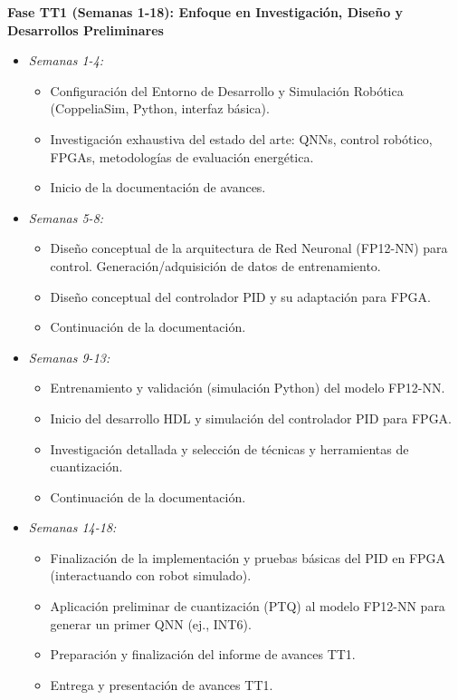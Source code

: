 \documentclass[12pt]{article}
\begin{document}
\textbf{Fase TT1 (Semanas 1-18): Enfoque en Investigación, Diseño y Desarrollos Preliminares}
\begin{itemize}
    \item \textit{Semanas 1-4:}
        \begin{itemize}
            \item [EP01] Configuración del Entorno de Desarrollo y Simulación Robótica (CoppeliaSim, Python, interfaz básica).
            \item [INV01] Investigación exhaustiva del estado del arte: QNNs, control robótico, FPGAs, metodologías de evaluación energética.
            \item [DOC1] Inicio de la documentación de avances.
        \end{itemize}
    \item \textit{Semanas 5-8:}
        \begin{itemize}
            \item [EP03] Diseño conceptual de la arquitectura de Red Neuronal (FP12-NN) para control. Generación/adquisición de datos de entrenamiento.
            \item [EP02] Diseño conceptual del controlador PID y su adaptación para FPGA.
            \item [DOC1] Continuación de la documentación.
        \end{itemize}
    \item \textit{Semanas 9-13:}
        \begin{itemize}
            \item [EP03] Entrenamiento y validación (simulación Python) del modelo FP12-NN.
            \item [EP02] Inicio del desarrollo HDL y simulación del controlador PID para FPGA.
            \item [EP05] Investigación detallada y selección de técnicas y herramientas de cuantización.
            \item [DOC1] Continuación de la documentación.
        \end{itemize}
    \item \textit{Semanas 14-18:}
        \begin{itemize}
            \item [EP02] Finalización de la implementación y pruebas básicas del PID en FPGA (interactuando con robot simulado).
            \item [EP05] Aplicación preliminar de cuantización (PTQ) al modelo FP12-NN para generar un primer QNN (ej., INT6).
            \item [DOC1] Preparación y finalización del informe de avances TT1.
            \item [ENT1] Entrega y presentación de avances TT1.
        \end{itemize}
\end{itemize}
\end{document}
